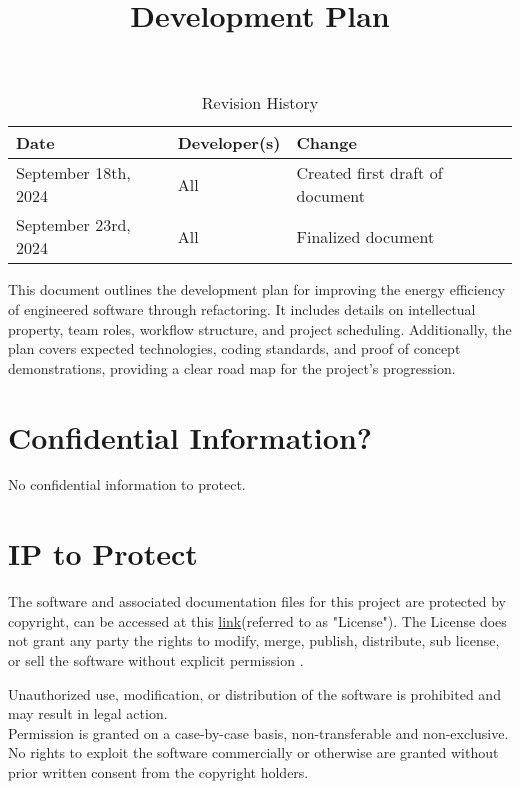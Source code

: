 \documentclass{article}
\title{Development Plan\\ \progname}
\author{\authname}
\date{}
\begin{document}
\maketitle

\begin{table}[hp]
  \caption{Revision History} \label{TblRevisionHistory}
  \begin{tabularx}{\textwidth}{llX}
    \toprule
    \textbf{Date} & \textbf{Developer(s)} & \textbf{Change}\\
    \midrule
    September 18th, 2024 & All & Created first draft of document\\
    September 23rd, 2024 & All & Finalized document\\
    \bottomrule
  \end{tabularx}
\end{table}

\newpage{}

\noindent
This document outlines the development plan for improving the energy efficiency of
engineered software through refactoring. It includes details on intellectual property,
team roles, workflow structure, and project scheduling. Additionally, the plan covers
expected technologies, coding standards, and proof of concept demonstrations, providing
a clear road map for the project's progression.

\section{Confidential Information?}

No confidential information to protect.
\section{IP to Protect}

\hspace{\parindent}The software and associated documentation files for this project are protected by copyright, can be accessed at this \href{https://github.com/ssm-lab/capstone--source-code-optimizer/blob/main/LICENSE}{ link}(referred to as "License"). The License does not grant any party the rights to modify, merge, publish, distribute, sub license, or sell the software without explicit permission .

Unauthorized use, modification, or distribution of the software is prohibited and may result in legal action.
\\

\hspace{\parindent} Permission is granted on a case-by-case basis, non-transferable and non-exclusive. No rights to exploit the software commercially or otherwise are granted without prior written consent from the copyright holders.
\end{document}

